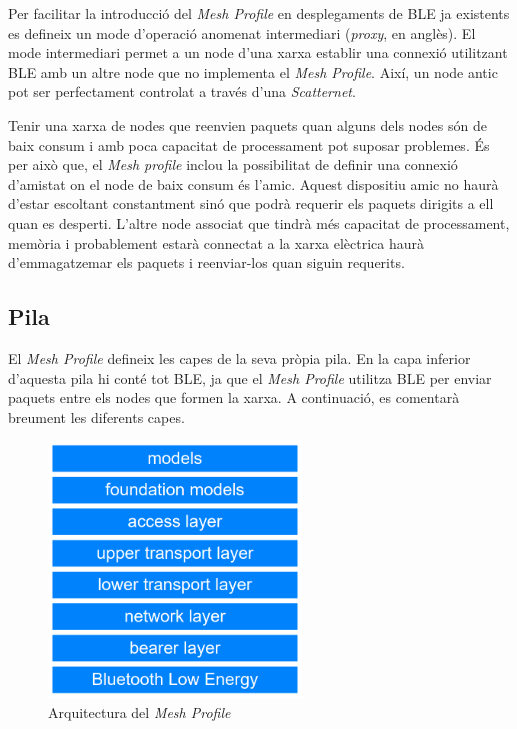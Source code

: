Per facilitar la introducció del \textit{Mesh Profile} en desplegaments de BLE ja existents es defineix un mode d'operació anomenat intermediari (\textit{proxy}, en anglès).
El mode intermediari permet a un node d'una xarxa establir una connexió utilitzant BLE amb un altre node que no implementa el \textit{Mesh Profile}.
Així, un node antic pot ser perfectament controlat a través d'una \textit{Scatternet}.

Tenir una xarxa de nodes que reenvien paquets quan alguns dels nodes són de baix consum i amb poca capacitat de processament pot suposar problemes.
És per això que, el \textit{Mesh profile} inclou la possibilitat de definir una connexió d'amistat on el node de baix consum és l'amic.
Aquest dispositiu amic no haurà d'estar escoltant constantment sinó que podrà requerir els paquets dirigits a ell quan es desperti.
L'altre node associat que tindrà més capacitat de processament, memòria i probablement estarà connectat a la xarxa elèctrica haurà d'emmagatzemar els paquets i reenviar-los quan siguin requerits.

\subsection{Pila}
El \textit{Mesh Profile} defineix les capes de la seva pròpia pila.
En la capa inferior d'aquesta pila hi conté tot BLE, ja que el \textit{Mesh Profile} utilitza BLE per enviar paquets entre els nodes que formen la xarxa.
A continuació, es comentarà breument les diferents capes.

\begin{figure}[!h]
	\begin{center}
		\includegraphics[width=0.6\textwidth]{./images/mesh_profile_stack2.PNG}
		\caption{Arquitectura del \textit{Mesh Profile} \cite{Mesh Profile Overview}}
		\label{mesh_netowrk_stack}
	\end{center}
\end{figure}

